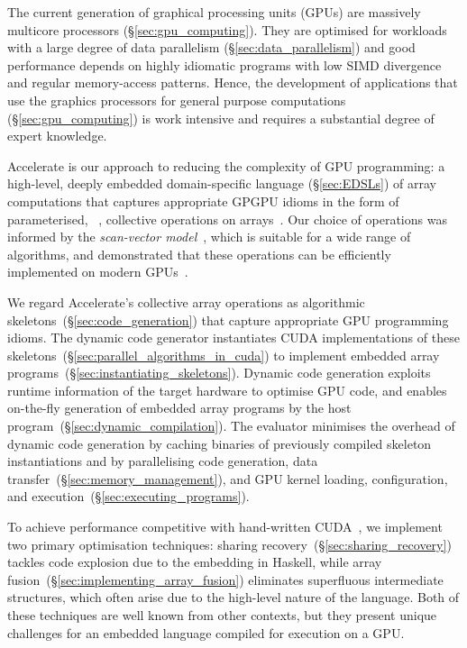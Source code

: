 The current generation of graphical processing units (GPUs) are massively
multicore processors (\S\ref{sec:gpu_computing}). They are optimised for
workloads with a large degree of data parallelism (\S\ref{sec:data_parallelism})
and good performance depends on highly idiomatic programs with low SIMD
divergence and regular memory-access patterns. Hence, the development of
applications that use the graphics processors for general purpose computations
(\S\ref{sec:gpu_computing}) is work intensive and requires a substantial degree
of expert knowledge.

Accelerate is our approach to reducing the complexity of GPU programming: a
high-level, deeply embedded domain-specific language (\S\ref{sec:EDSLs}) of
array computations that captures appropriate GPGPU idioms in the form of
parameterised, ~\cite{Keller:2010er}, collective
operations on arrays~\cite{Chakravarty:2011fr}. Our choice of operations was
informed by the \emph{scan-vector model}~\cite{Chatterjee:1990vj}, which is
suitable for a wide range of algorithms, and demonstrated that these operations
can be efficiently implemented on modern GPUs~\cite{Sengupta:2007tc}.

We regard Accelerate's collective array operations as algorithmic
skeletons~(\S\ref{sec:code_generation}) that capture appropriate GPU programming
idioms. The dynamic code generator instantiates CUDA implementations of these
skeletons~(\S\ref{sec:parallel_algorithms_in_cuda}) to implement embedded array
programs~(\S\ref{sec:instantiating_skeletons}). Dynamic code generation exploits
runtime information of the target hardware to optimise GPU code, and enables
on-the-fly generation of embedded array programs by the host
program~(\S\ref{sec:dynamic_compilation}). The evaluator minimises the overhead
of dynamic code generation by caching binaries of previously compiled skeleton
instantiations and by parallelising code generation, data
transfer~(\S\ref{sec:memory_management}), and GPU kernel loading, configuration,
and execution~(\S\ref{sec:executing_programs}).

To achieve performance competitive with hand-written
CUDA~\cite{McDonell:2013wi}, we implement two primary optimisation techniques:
sharing recovery~(\S\ref{sec:sharing_recovery}) tackles code explosion due to
the embedding in Haskell, while array
fusion~(\S\ref{sec:implementing_array_fusion}) eliminates superfluous
intermediate structures, which often arise due to the high-level nature of the
language. Both of these techniques are well known from other contexts, but they
present unique challenges for an embedded language compiled for execution on a
GPU.


